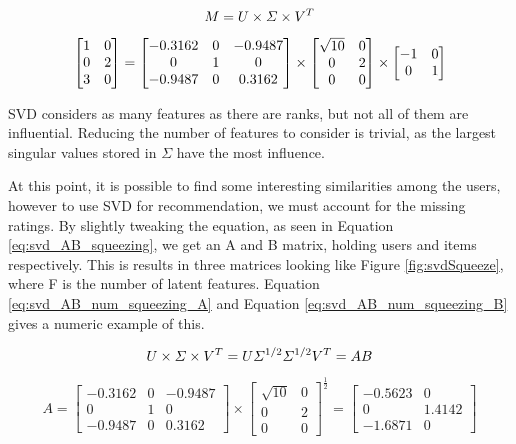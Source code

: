 \begin{equation} \label{eq:svd_decomp}
\centering
M = U\times \Sigma \times V^T
\end{equation}

\begin{equation}\label{eq:svd_num_decomp}
\centering
\begin{bmatrix}
1 & 0\\ 
0 & 2\\ 
3 & 0
\end{bmatrix} = 
\begin{bmatrix}
-0.3162 & 0 & -0.9487\\ 
0 & 1 & 0\\ 
-0.9487 & 0 & 0.3162
\end{bmatrix} \times 
\begin{bmatrix}
\sqrt{10} & 0\\ 
0 & 2\\ 
0 & 0
\end{bmatrix} \times
\begin{bmatrix}
-1 & 0\\ 
0 & 1
\end{bmatrix}
\end{equation}

SVD considers as many features as there are ranks, but not all of them are influential. Reducing the number of features to consider is trivial, as the largest singular values stored in $\Sigma$ have the most influence.

At this point, it is possible to find some interesting similarities among the users, however to use SVD for recommendation, we must account for the missing ratings. By slightly tweaking the equation, as seen in Equation \ref{eq:svd_AB_squeezing}, we get an A and B matrix, holding users and items respectively. This is results in three matrices looking like Figure \ref{fig:svdSqueeze}, where F is the number of latent features. Equation \ref{eq:svd_AB_num_squeezing_A} and Equation \ref{eq:svd_AB_num_squeezing_B} gives a numeric example of this.

\begin{equation}\label{eq:svd_AB_squeezing}
	\centering
	U\times \Sigma \times V^T = U\Sigma^{1/2} \Sigma^{1/2}V^T = AB
\end{equation}

\begin{equation}\label{eq:svd_AB_num_squeezing_A}
A = \begin{bmatrix}
-0.3162 & 0 & -0.9487\\ 
0 & 1 & 0\\ 
-0.9487 & 0 & 0.3162
\end{bmatrix} \times
\begin{bmatrix}
\sqrt{10} & 0\\ 
0 & 2\\ 
0 & 0
\end{bmatrix}^{\frac{1}{2}} =
\begin{bmatrix}
-0.5623 & 0\\ 
0 & 1.4142\\ 
-1.6871 & 0
\end{bmatrix}
\end{equation}


